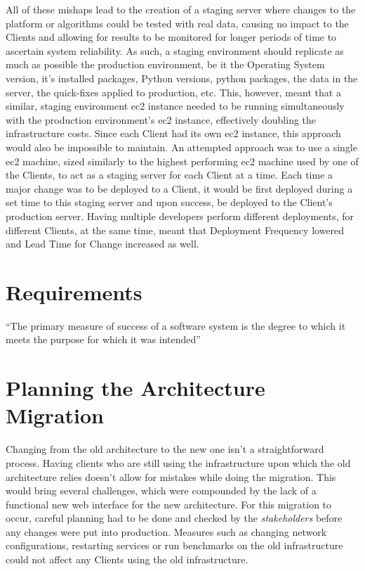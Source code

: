 All of these mishaps lead to the creation of a staging server where changes to the platform or algorithms could be tested with real data, causing no impact to the Clients and allowing for results to be monitored for longer periods of time to ascertain system reliability. As such, a staging environment should replicate as much as possible the production environment, be it the Operating System version, it's installed packages, Python versions, python packages, the data in the server, the quick-fixes applied to production, etc.
This, however, meant that a similar, staging environment \gls{ec2} instance needed to be running simultaneously with the production environment's \gls{ec2} instance, effectively doubling the infrastructure costs. Since each Client had its own \gls{ec2} instance, this approach would also be impossible to maintain. An attempted approach was to use a single \gls{ec2} machine, sized similarly to the highest performing \gls{ec2} machine used by one of the Clients, to act as a staging server for each Client at a time. Each time a major change was to be deployed to a Client, it would be first deployed during a set time to this staging server and upon success, be deployed to the Client's production server. Having multiple developers perform different deployments, for different Clients, at the same time, meant that Deployment Frequency lowered and Lead Time for Change increased as well.


\section{Requirements}\label{methodology:s:requirements}

``The primary measure of success of a software system is the
degree to which it meets the purpose for which it was
intended''


\section{Planning the Architecture Migration}\label{methodology:s:planning-the-architecture-migration}

Changing from the old architecture to the new one isn't a straightforward process. Having clients who are still using the infrastructure upon which the old architecture relies doesn't allow for mistakes while doing the migration. This would bring several challenges, which were compounded by the lack of a functional new web interface for the new architecture. For this migration to occur, careful planning had to be done and checked by the \textit{stakeholders} before any changes were put into production. Measures such as changing network configurations, restarting services or run benchmarks on the old infrastructure could not affect any Clients using the old infrastructure.


